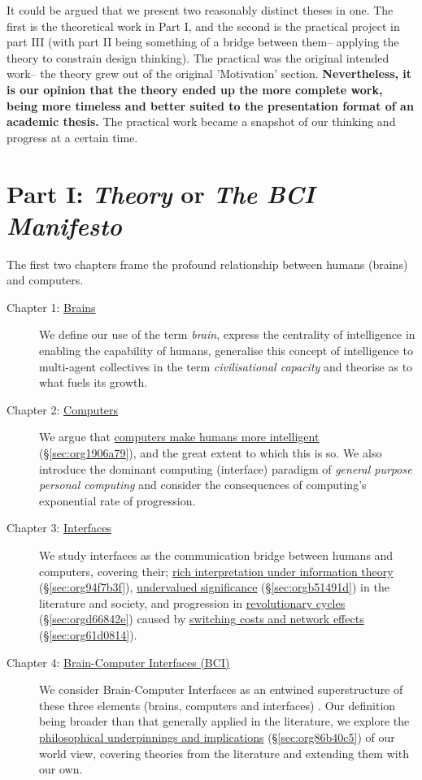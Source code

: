 \documentclass[logo,bsc,singlespacing,parskip]{infthesis}
\begin{document}
It could be argued that we present two reasonably distinct theses in one.
The first is the theoretical work in Part I, and the second is the practical project in part III (with part II being something of a bridge between them-- applying the theory to constrain design thinking).
The practical was the original intended work-- the theory grew out of the original 'Motivation' section.
\textbf{Nevertheless, it is our opinion that the theory ended up the more complete work, being more timeless and better suited to the presentation format of an academic thesis.}
The practical work became a snapshot of our thinking and progress at a certain time.
\section*{Part I: \emph{Theory} or \emph{The BCI Manifesto}}
\label{sec:org2b6b7c0}
The first two chapters frame the profound relationship between humans (brains) and computers.

\begin{description}
\item[{Chapter 1: \hyperref[sec:org3af2793]{Brains}}] We define our use of the term \emph{brain}, express the centrality of intelligence in enabling the capability of humans, generalise this concept of intelligence to multi-agent collectives in the term \emph{civilisational capacity} and theorise as to what fuels its growth.

\item[{Chapter 2: \hyperref[sec:org21e9465]{Computers}}] We argue that \hyperref[sec:org1906a79]{computers make humans more intelligent} (\S \ref{sec:org1906a79}), and the great extent to which this is so.
We also introduce the dominant computing (interface) paradigm of \emph{general purpose personal computing} and consider the consequences of computing's exponential rate of progression.

\item[{Chapter 3: \hyperref[sec:org020dbaa]{Interfaces}}] We study interfaces as the communication bridge between humans and computers, covering their;  \hyperref[sec:org94f7b3f]{rich interpretation under information theory} (\S \ref{sec:org94f7b3f}), \hyperref[sec:orgb51491d]{undervalued significance} (\S \ref{sec:orgb51491d}) in the literature and society, and progression in \hyperref[sec:orgd66842e]{revolutionary cycles} (\S \ref{sec:orgd66842e}) caused by \hyperref[sec:org61d0814]{switching costs and network effects} (\S \ref{sec:org61d0814}).

\item[{Chapter 4: \hyperref[sec:org9ee01b8]{Brain-Computer Interfaces (BCI)}}] We consider Brain-Computer Interfaces as an entwined superstructure of these three elements (brains, computers and interfaces) . Our definition being broader than that generally applied in the literature, we explore the \hyperref[sec:org86b40c5]{philosophical underpinnings and implications} (\S \ref{sec:org86b40c5}) of our world view, covering theories from the literature and extending them with our own.
\end{description}
\end{document}
